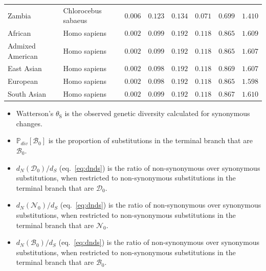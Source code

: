 \documentclass[12pt]{article}
\newcommand{\proba}{\mathbb{P}}
\newcommand{\dn}{d_N}
\newcommand{\ds}{d_S}
\newcommand{\SphyDel}{\mathcal{D}_0}
\newcommand{\SphyNeu}{\mathcal{N}_0}
\newcommand{\SphyBen}{\mathcal{B}_0}
\newcommand{\thetaSyn}{\theta_{\text{S}}}
\begin{document}
\begin{center}
\begin{longtable*}{|l|l|r|r|r|r|r|r|}
             Zambia & Chlorocebus sabaeus &               $ 0.006$ &                    $ 0.123$ &  $ 0.134$ &            $ 0.071$ &                $ 0.699$ &           $ 1.410$ \\
            African &        Homo sapiens &               $ 0.002$ &                    $ 0.099$ &  $ 0.192$ &            $ 0.118$ &                $ 0.865$ &           $ 1.609$ \\
            Admixed American &        Homo sapiens &               $ 0.002$ &                    $ 0.099$ &  $ 0.192$ &            $ 0.118$ &                $ 0.865$ &           $ 1.607$ \\
            East Asian &        Homo sapiens &               $ 0.002$ &                    $ 0.098$ &  $ 0.192$ &            $ 0.118$ &                $ 0.869$ &           $ 1.607$ \\
            European &        Homo sapiens &               $ 0.002$ &                    $ 0.098$ &  $ 0.192$ &            $ 0.118$ &                $ 0.865$ &           $ 1.598$ \\
            South Asian &        Homo sapiens &               $ 0.002$ &                    $ 0.099$ &  $ 0.192$ &            $ 0.118$ &                $ 0.867$ &           $ 1.610$ \\
        \end{longtable*}
    \end{center}
    \begin{itemize}
        \item Watterson's $\thetaSyn$ is the observed genetic diversity calculated for synonymous changes.
        \item $\proba_{div}[\SphyBen]$ is the proportion of substitutions in the terminal branch that are $\SphyBen$.
        \item $\dn(\SphyDel) / \ds$ (eq.~\ref{eq:dnds}) is the ratio of non-synonymous over synonymous substitutions, when restricted to non-synonymous substitutions in the terminal branch that are $\SphyDel$.
        \item $\dn(\SphyNeu) / \ds$ (eq.~\ref{eq:dnds}) is the ratio of non-synonymous over synonymous substitutions, when restricted to non-synonymous substitutions in the terminal branch that are $\SphyNeu$.
        \item $\dn(\SphyBen) / \ds$ (eq.~\ref{eq:dnds}) is the ratio of non-synonymous over synonymous substitutions, when restricted to non-synonymous substitutions in the terminal branch that are $\SphyBen$.
    \end{itemize}
\end{document}
